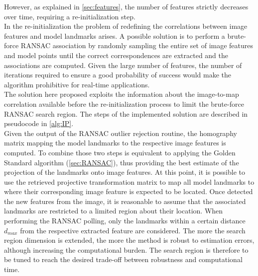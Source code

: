 However, as explained in \cref{sec:features}, the number of features strictly decreases over time, requiring a re-initialization step. \\
In the re-initialization the problem of redefining the correlations between image features and model landmarks arises. A possible solution is to perform a brute-force RANSAC association by randomly sampling the entire set of image features and model points until the correct correspondences are extracted and the associations are computed.  Given the large number of features, the number of iterations required to ensure a good probability of success would make the algorithm prohibitive for real-time applications. \\
The solution here proposed exploits the information about the image-to-map correlation available before the re-initialization process to limit the brute-force RANSAC search region.  The steps of the implemented solution are described in pseudocode in \cref{alg:IP}. \\ 
Given the output of the RANSAC outlier rejection routine, the homography matrix mapping the model landmarks to the respective image features is computed. To combine those two steps is equivalent to applying the Golden Standard algorithm (\cref{sec:RANSAC}), thus providing the best estimate of the projection of the landmarks onto image features. At this point, it is possible to use the retrieved projective transformation matrix to map all model landmarks to where their corresponding image feature is expected to be located. Once detected the new features from the image, it is reasonable to assume that the associated landmarks are  restricted to a limited region about their location. When performing the RANSAC polling, only the landmarks within a certain distance $d_{max}$ from the respective extracted feature are considered. The more the search region dimension is extended, the more the method is robust to estimation errors, although increasing the computational burden. The search region is therefore to be tuned to reach the desired trade-off between robustness and computational time. 

